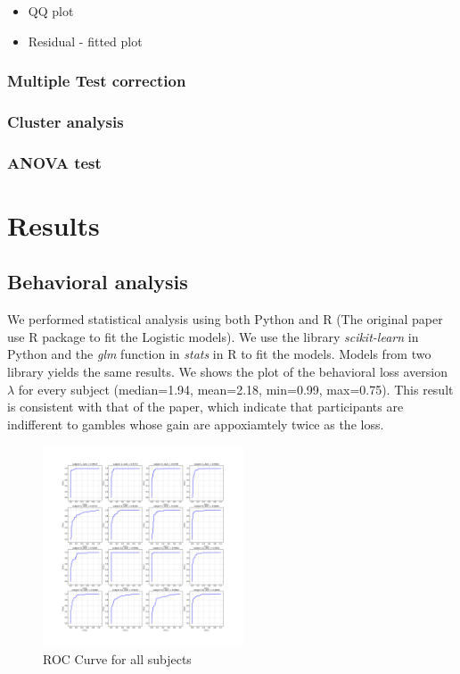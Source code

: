 \documentclass[11pt]{article}
\begin{document}
\begin{itemize}
\item{QQ plot}
\item{Residual - fitted plot}
\end{itemize}


\subsubsection{Multiple Test correction}

\subsubsection{Cluster analysis}

\subsubsection{ANOVA test}


\section{Results}

\subsection{Behavioral analysis}

We performed statistical analysis using both Python and R (The original paper use R package to fit the Logistic models). We use the library \emph{scikit-learn} in Python and the \emph{glm} function in \emph{stats} in R to fit the models. Models from two library yields the same results. We shows the plot of the behavioral loss aversion $\lambda$ for every subject (median=1.94, mean=2.18, min=0.99, max=0.75). This result is consistent with that of the paper, which indicate that participants are indifferent to gambles whose gain are appoxiamtely twice as the loss. 


\begin{figure}
  \begin{center}
    \includegraphics[width=0.53\textwidth]{figures/Regression1/roc_curve.png} 
    \caption{ROC Curve for all subjects}
  \end{center}
\end{figure}
\end{document}
